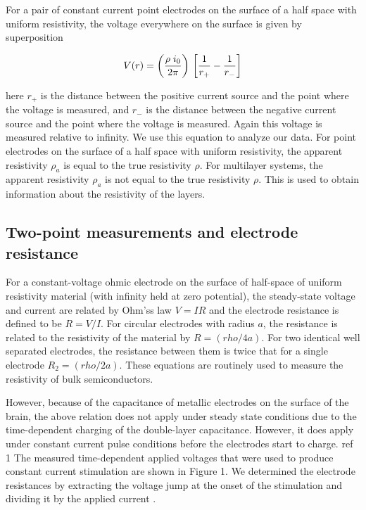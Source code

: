 For a pair of constant current point electrodes on the surface of a half space with uniform resistivity, the voltage everywhere on the surface is given by superposition

$$V(r) = \bigg( {\rho \; i_0  \over 2 \pi} \bigg) \ \bigg[ {1\over r_+} -  {1\over r_-} \bigg]$$

\noindent here $r_+$ is the distance between the positive current source and the point where the voltage is measured, and
$r_-$ is the distance between the negative current source and the point where the voltage is measured. Again this voltage is measured relative to infinity. We use this equation to analyze our data. For point electrodes on the surface of a half space with uniform resistivity, the apparent resistivity $\rho_a$ is equal to the true resistivity $\rho$. For multilayer systems, the apparent resistivity $\rho_a$ is not equal to the true resistivity $\rho$. This is used to obtain information about the
resistivity of the layers.

\subsection{Two-point measurements and electrode resistance}

For a constant-voltage ohmic electrode on the surface of half-space of uniform resistivity material (with infinity held at zero potential), the steady-state voltage and current are related by Ohm’ss law $V=IR$ and the electrode resistance is defined to be $R=V/I$. For circular electrodes with radius $a$, the resistance is related to the resistivity of the material by $R=(rho/4a)$. For two identical well separated electrodes, the resistance between them is twice that for a single electrode $R_2=(rho/2a)$. These equations are routinely used to measure the resistivity of bulk semiconductors.

However, because of the capacitance of metallic electrodes on the surface of the brain, the above relation does not apply under steady state conditions due to the time-dependent charging of the double-layer capacitance. However, it does apply under constant current pulse conditions before the electrodes start to charge. {ref 1} The measured time-dependent applied voltages that were used to produce constant current stimulation are shown in Figure 1. We determined the electrode resistances by extracting the voltage jump at the onset of the stimulation and dividing it by the applied current \cite{Huang2008a}.

